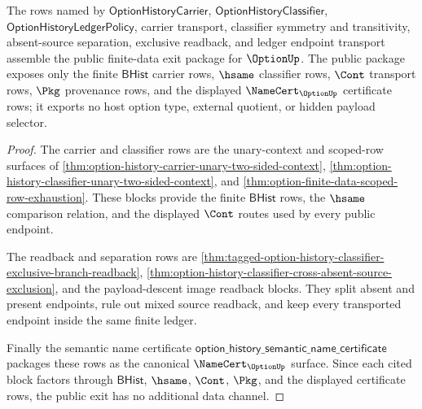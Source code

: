 
\begin{theorem}
\label{thm:option-finite-data-public-exit-package}
The rows named by $\mathsf{OptionHistoryCarrier}$,
$\mathsf{OptionHistoryClassifier}$, $\mathsf{OptionHistoryLedgerPolicy}$,
carrier transport, classifier symmetry and transitivity, absent-source
separation, exclusive readback, and ledger endpoint transport assemble the
public finite-data exit package for $\OptionUp$. The public package exposes
only the finite $\mathsf{BHist}$ carrier rows, $\hsame$ classifier rows,
$\Cont$ transport rows, $\Pkg$ provenance rows, and the displayed
$\NameCert_{\OptionUp}$ certificate rows; it exports no host option type,
external quotient, or hidden payload selector.
\end{theorem}
\begin{proof}
The carrier and classifier rows are the unary-context and scoped-row surfaces
of \autoref{thm:option-history-carrier-unary-two-sided-context},
\autoref{thm:option-history-classifier-unary-two-sided-context}, and
\autoref{thm:option-finite-data-scoped-row-exhaustion}. These blocks provide
the finite $\mathsf{BHist}$ rows, the $\hsame$ comparison relation, and the
displayed $\Cont$ routes used by every public endpoint.

The readback and separation rows are
\autoref{thm:tagged-option-history-classifier-exclusive-branch-readback},
\autoref{thm:option-history-classifier-cross-absent-source-exclusion}, and the
payload-descent image readback blocks. They split absent and present endpoints,
rule out mixed source readback, and keep every transported endpoint inside the
same finite ledger.

Finally the semantic name certificate
$\mathsf{option\_history\_semantic\_name\_certificate}$ packages these rows as
the canonical $\NameCert_{\OptionUp}$ surface. Since each cited block factors
through $\mathsf{BHist}$, $\hsame$, $\Cont$, $\Pkg$, and the displayed
certificate rows, the public exit has no additional data channel.
\end{proof}

